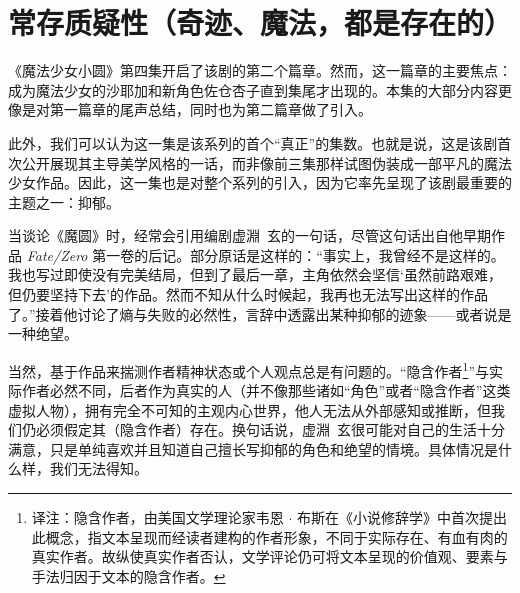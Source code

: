\chapter[常存质疑性（奇迹、魔法，都是存在的）]{常存质疑性\protect\footnotemark（奇迹、魔法，都是存在的）}


《魔法少女小圆》第四集开启了该剧的第二个篇章。然而，这一篇章的主要焦点：成为魔法少女的沙耶加和新角色佐仓杏子直到集尾才出现的。本集的大部分内容更像是对第一篇章的尾声总结，同时也为第二篇章做了引入。

此外，我们可以认为这一集是该系列的首个“真正”的集数。也就是说，这是该剧首次公开展现其主导美学风格的一话，而非像前三集那样试图伪装成一部平凡的魔法少女作品。因此，这一集也是对整个系列的引入，因为它率先呈现了该剧最重要的主题之一：抑郁。

当谈论《魔圆》时，经常会引用编剧虚淵\, 玄的一句话，尽管这句话出自他早期作品 \emph{Fate/Zero} 第一卷的后记。部分原话是这样的：“事实上，我曾经不是这样的。我也写过即使没有完美结局，但到了最后一章，主角依然会坚信‘虽然前路艰难，但仍要坚持下去’的作品。然而不知从什么时候起，我再也无法写出这样的作品了。”\cite{ref29}接着他讨论了熵与失败的必然性，言辞中透露出某种抑郁的迹象——或者说是一种绝望。

当然，基于作品来揣测作者精神状态或个人观点总是有问题的。“隐含作者\footnote{译注：隐含作者，由美国文学理论家韦恩 $\cdot$ 布斯在《小说修辞学》中首次提出此概念，指文本呈现而经读者建构的作者形象，不同于实际存在、有血有肉的真实作者。故纵使真实作者否认，文学评论仍可将文本呈现的价值观、要素与手法归因于文本的隐含作者。}\cite{ref30}”与实际作者必然不同，后者作为真实的人（并不像那些诸如“角色”或者“隐含作者”这类虚拟人物），拥有完全不可知的主观内心世界，他人无法从外部感知或推断，但我们仍必须假定其（隐含作者）存在。换句话说，虚淵\, 玄很可能对自己的生活十分满意，只是单纯喜欢并且知道自己擅长写抑郁的角色和绝望的情境。具体情况是什么样，我们无法得知。

